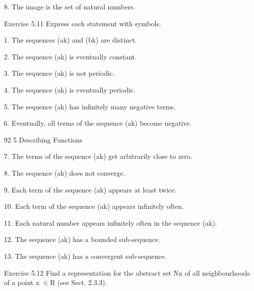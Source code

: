 \documentclass[11pt]{article}
\theoremstyle{plain}
\theoremstyle{definition}
\begin{document}
8. The image is the set of natural numbers.

Exercise 5.11 Express each statement with symbols.

1. The sequences (ak) and (bk) are distinct.

2. The sequence (ak) is eventually constant.

3. The sequence (ak) is not periodic.

4. The sequence (ak) is eventually periodic.

5. The sequence (ak) has infinitely many negative terms.

6. Eventually, all terms of the sequence (ak) become negative.

92 5 Describing Functions

7. The terms of the sequence (ak) get arbitrarily close to zero.

8. The sequence (ak) does not converge.

9. Each term of the sequence (ak) appears at least twice.

10. Each term of the sequence (ak) appears infinitely often.

11. Each natural number appears infinitely often in the sequence (ak).

12. The sequence (ak) has a bounded sub-sequence.

13. The sequence (ak) has a convergent sub-sequence.

Exercise 5.12 Find a representation for the abstract set Nx of all neighbourhoods of a point x $\in$R (see Sect. 2.3.3).
\end{document}
